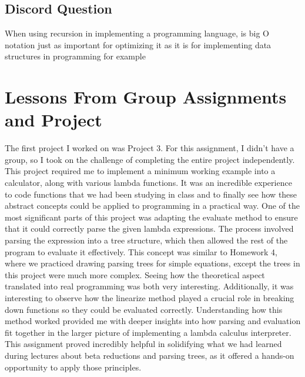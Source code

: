 \documentclass{article}
\theoremstyle{plain}
\theoremstyle{definition}
\theoremstyle{remark}
\begin{document}
\subsection{Discord Question}

When using recursion in implementing a programming language, is big O notation just as important for optimizing it as it is for implementing data structures in programming for example

\section{Lessons From Group Assignments and Project}\label{lessonsFromGroupAssignmentsAndProject}


The first project I worked on was Project 3. For this assignment, I didn’t have a group, so I took on the challenge of completing the entire project independently. This project required me to implement a minimum working example into a calculator, along with various lambda functions. It was an incredible experience to code functions that we had been studying in class and to finally see how these abstract concepts could be applied to programming in a practical way. One of the most significant parts of this project was adapting the evaluate method to ensure that it could correctly parse the given lambda expressions. The process involved parsing the expression into a tree structure, which then allowed the rest of the program to evaluate it effectively. This concept was similar to Homework 4, where we practiced drawing parsing trees for simple equations, except the trees in this project were much more complex. Seeing how the theoretical aspect translated into real programming was both very interesting. Additionally, it was interesting to observe how the linearize method played a crucial role in breaking down functions so they could be evaluated correctly. Understanding how this method worked provided me with deeper insights into how parsing and evaluation fit together in the larger picture of implementing a lambda calculus interpreter. This assignment proved incredibly helpful in solidifying what we had learned during lectures about beta reductions and parsing trees, as it offered a hands-on opportunity to apply those principles. 
\end{document}
